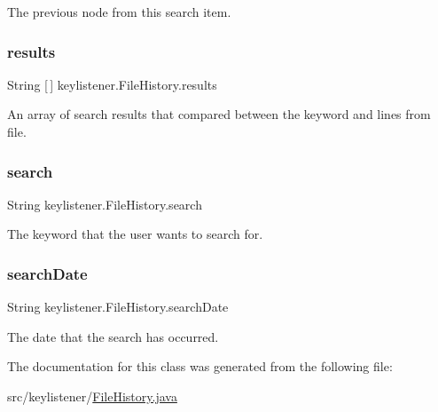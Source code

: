 The previous node from this search item. \mbox{\label{classkeylistener_1_1_file_history_a665862b474b78805e841aaf23ab1123c}} 
\subsubsection{\texorpdfstring{results}{results}}
{\footnotesize\ttfamily String \mbox{[}$\,$\mbox{]} keylistener.\+File\+History.\+results\hspace{0.3cm}{\ttfamily [private]}}

An array of search results that compared between the keyword and lines from file. \mbox{\label{classkeylistener_1_1_file_history_a6370f7f80f43860c1da4962b9e0a3f01}} 
\subsubsection{\texorpdfstring{search}{search}}
{\footnotesize\ttfamily String keylistener.\+File\+History.\+search\hspace{0.3cm}{\ttfamily [private]}}

The keyword that the user wants to search for. \mbox{\label{classkeylistener_1_1_file_history_aa05796c787baef3237827630d3284496}} 
\subsubsection{\texorpdfstring{search\+Date}{searchDate}}
{\footnotesize\ttfamily String keylistener.\+File\+History.\+search\+Date\hspace{0.3cm}{\ttfamily [private]}}

The date that the search has occurred. 

The documentation for this class was generated from the following file\+:\begin{DoxyCompactItemize}
\item 
src/keylistener/\hyperlink{_file_history_8java}{File\+History.\+java}\end{DoxyCompactItemize}
